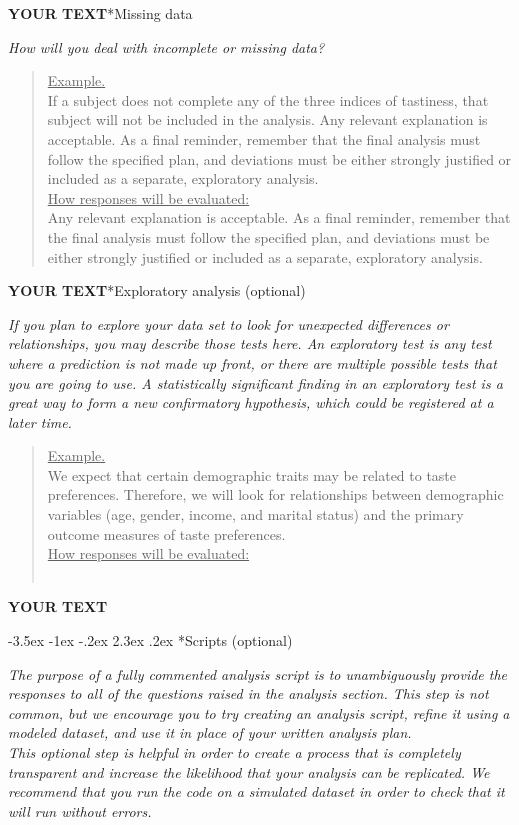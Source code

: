 \documentclass{article}
\makeatletter
\newcommand{\example}[2]{\vspace{-0.3cm}\begin{quote}\underline{Example.}\\#1\ifx#2\undefined \else \\[0.2cm]\underline{How responses will be evaluated:}\\#2\fi\\\end{quote}}
\newcommand{\yourtext}[1]{\noindent\textbf{\color{red}YOUR TEXT}}
\renewcommand{\section}{\@startsection {section}{1}{\z@}%
	{-3.5ex \@plus -1ex \@minus -.2ex}%
	{2.3ex \@plus .2ex}%
	{\normalfont\LARGE\bfseries}}
\makeatother
\begin{document}
	\yourtext
	
	\subsection*{Missing data}
	
	\ifx\hidehints\undefined
	
	\textit{%
		How will you deal with incomplete or missing data?
	}\\
	
	\example{
		If a subject does not complete any of the three indices of tastiness, that subject will not be included in the analysis.
		}{Any relevant explanation is acceptable. As a final reminder, remember that the final analysis must follow the specified plan, and deviations must be either strongly justified or included as a separate, exploratory analysis.}
	\fi
	
	\yourtext
	
	\subsection*{Exploratory analysis (optional)}
	
	\ifx\hidehints\undefined
	
	\textit{%
		If you plan to explore your data set to look for unexpected differences or relationships, you may describe those tests here. An exploratory test is any test where a prediction is not made up front, or there are multiple possible tests that you are going to use. A statistically significant finding in an exploratory test is a great way to form a new confirmatory hypothesis, which could be registered at a later time.
	}\\
	
	\example{
		We expect that certain demographic traits may be related to taste preferences. Therefore, we will look for relationships between demographic variables (age, gender, income, and marital status) and the primary outcome measures of taste preferences.}{}
	\fi
	
	\yourtext

\newpage

\section*{Scripts (optional)}

	\ifx\hidehints\undefined

	\textit{The purpose of a fully commented analysis script is to unambiguously provide the responses to all of the questions raised in the analysis section. This step is not common, but we encourage you to try creating an analysis script, refine it using a modeled dataset, and use it in place of your written analysis plan.\\	
	This optional step is helpful in order to create a process that is completely transparent and increase the likelihood that your analysis can be replicated. We recommend that you run the code on a simulated dataset in order to check that it will run without errors.
	}
	
\end{document}
